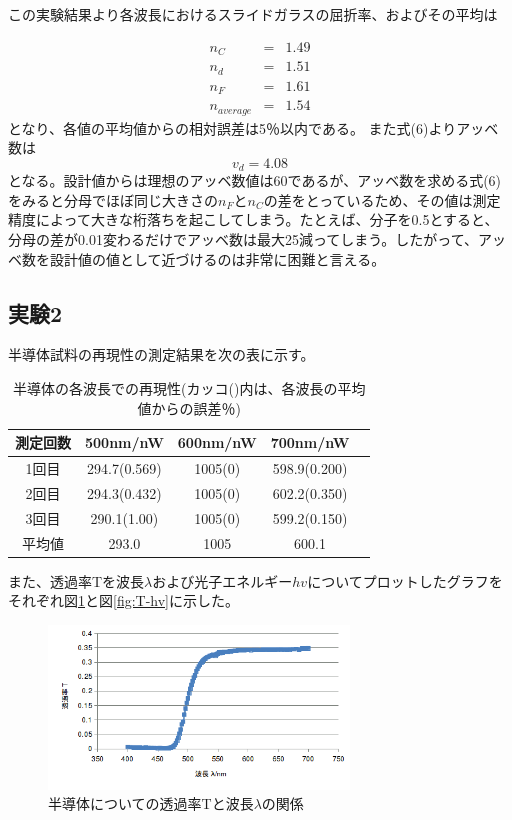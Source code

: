 \documentclass[11pt,a4j]{jsarticle}
\begin{document}
この実験結果より各波長におけるスライドガラスの屈折率、およびその平均は
  
  \begin{eqnarray}
  n_C &=& 1.49 \nonumber \\
  n_d &=& 1.51 \nonumber \\
  n_F &=& 1.61 \nonumber  \\
  n_{average} &=& 1.54 \nonumber 
  \end{eqnarray}
  となり、各値の平均値からの相対誤差は5％以内である。
  また式(6)よりアッベ数は
  \begin{equation}
  v_d = 4.08 \nonumber 
  \end{equation}
  となる。設計値からは理想のアッベ数値は60であるが、アッベ数を求める式(6)をみると分母でほぼ同じ大きさの$n_Fとn_C$の差をとっているため、その値は測定精度によって大きな桁落ちを起こしてしまう。たとえば、分子を0.5とすると、分母の差が0.01変わるだけでアッベ数は最大25減ってしまう。したがって、アッベ数を設計値の値として近づけるのは非常に困難と言える。
  
  \subsection{実験2}
  半導体試料の再現性の測定結果を次の表に示す。
  \begin{table}[htb]
  \begin{center}
    \caption{半導体の各波長での再現性(カッコ()内は、各波長の平均値からの誤差％)}
    \begin{tabular}{ccccc} \toprule
測定回数 & 500nm/nW & 600nm/nW & 700nm/nW \\ \midrule
1回目 & 294.7(0.569) & 1005(0) & 598.9(0.200) \\
2回目 & 294.3(0.432) & 1005(0) & 602.2(0.350) \\
3回目 & 290.1(1.00) & 1005(0) & 599.2(0.150) \\ \midrule
平均値 & 293.0 & 1005 & 600.1 \\ \bottomrule
    \end{tabular}
    \label{tab:price}
  \end{center}
\end{table}

  また、透過率Tを波長$\lambda$および光子エネルギー$hv$についてプロットしたグラフをそれぞれ図\ref{fig:T-lambda}と図\ref{fig:T-hv}に示した。
  \begin{figure}[htbp]
  \centering
  \includegraphics[width=8cm,clip]{1_2_T-lambda.png}
  \caption{半導体についての透過率Tと波長$\lambda$の関係}
  \label{fig:T-lambda}
 \end{figure}%
 
\end{document}
